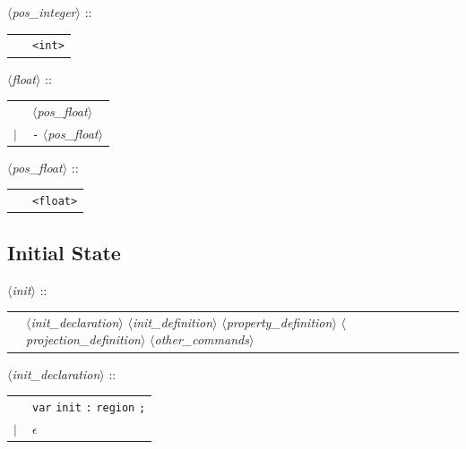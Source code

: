 \documentclass[a4paper,11pt]{report}
\newcommand{\emptystring}{$\epsilon$}
\newcommand{\nt}[1]{$\langle$\emph{#1}$\rangle$}
\newcommand{\regleGrammaire}[1]{\bigskip \noindent \nt{#1} :: \\}
\newcommand{\npec}[1]{\textcolor{green!50!black}{#1}}
\newcommand{\styleIMI}[1]{\textcolor{imicolor}{\texttt{#1}}}
\begin{document}
\regleGrammaire{pos\_integer}
\begin{tabular}{l l}
	\  & \styleIMI{<int>} \\
\end{tabular}



\regleGrammaire{float}
\begin{tabular}{l l}
	\  & \nt{pos\_float} \\
	$|$ & \styleIMI{-} \nt{pos\_float}  \\
\end{tabular}


\regleGrammaire{pos\_float}
\begin{tabular}{l l}
	\  & \styleIMI{<float>} \\
\end{tabular}


\subsection{Initial State}

\regleGrammaire{init}
\begin{tabular}{l l}
	& \npec{\nt{init\_declaration}} \nt{init\_definition} \nt{property\_definition} \nt{projection\_definition} \npec{\nt{other\_commands}} \\
\end{tabular}

\regleGrammaire{\npec{init\_declaration}}
\begin{tabular}{l l}
	\  & \npec{\styleIMI{var} \styleIMI{init} \styleIMI{:} \styleIMI{region} \styleIMI{;}} \\
	$|$ & \emptystring \\
\end{tabular}
\end{document}
